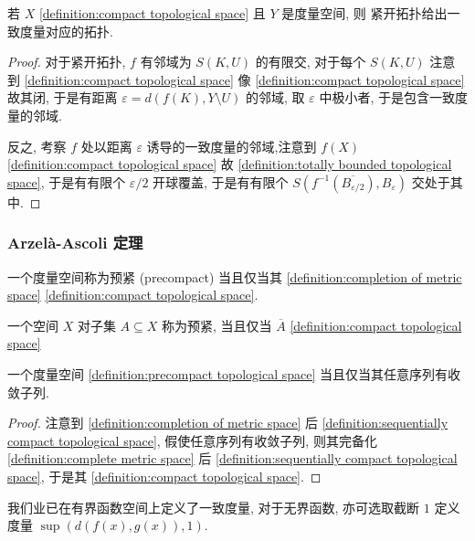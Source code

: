 \begin{lemma}
    若 \(X\) \ref{definition:compact topological space} 且 \(Y\) 是度量空间, 则
    紧开拓扑给出一致度量对应的拓扑.

    \begin{proof}
        对于紧开拓扑, \(f\) 有邻域为 \(S(K,U)\) 的有限交, 对于每个 \(S(K,U)\) 注意到 \ref{definition:compact topological space}
        像 \ref{definition:compact topological space} 故其闭, 于是有距离 \(\varepsilon = d (f(K),Y \setminus U)\) 的邻域, 取 \(\varepsilon\) 中极小者, 于是包含一致度量的邻域.

        反之, 考察 \(f\) 处以距离 \(\varepsilon\) 诱导的一致度量的邻域,注意到 \(f(X)\) \ref{definition:compact topological space} 故 \ref{definition:totally bounded topological space},
        于是有有限个 \(\varepsilon/2\) 开球覆盖, 于是有有限个 \(S(f^{-1} (\overline{B_{\varepsilon/2}}),B_\varepsilon)\) 交处于其中.
    \end{proof}
\end{lemma}

\subsubsection{Arzelà-Ascoli 定理}

\begin{definition}[预紧]
    \label {definition:precompact topological space}
    一个度量空间称为预紧 (precompact) 当且仅当其 \ref{definition:completion of metric space} \ref{definition:compact topological space}.

    一个空间 \(X\) 对子集 \(A \subseteq X\) 称为预紧, 当且仅当 \(\overline{A}\) \ref{definition:compact topological space}
\end{definition}

\begin{lemma}
    一个度量空间 \ref{definition:precompact topological space} 当且仅当其任意序列有收敛子列.

    \begin{proof}
        注意到 \ref{definition:completion of metric space} 后 \ref{definition:sequentially compact topological space}, 假使任意序列有收敛子列,
        则其完备化 \ref{definition:complete metric space} 后 \ref{definition:sequentially compact topological space}, 于是其 \ref{definition:compact topological space}.
    \end{proof}
\end{lemma}

\begin{remark}
    我们业已在有界函数空间上定义了一致度量, 对于无界函数, 亦可选取截断 \(1\) 定义度量 \(\sup (d(f(x),g(x)),1)\).
\end{remark}

